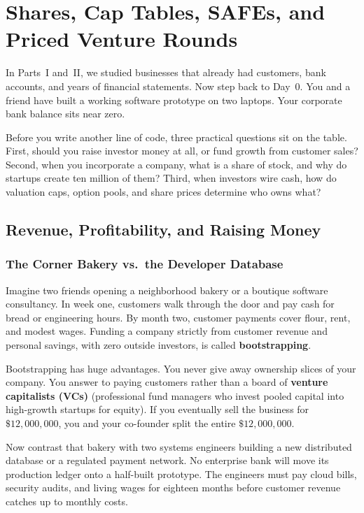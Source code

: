 \chapter{Shares, Cap Tables, SAFEs, and Priced Venture Rounds}
\label{ch:cap-tables-safes}
\chapterline

In Parts~I and~II, we studied businesses that already had customers, bank accounts, and years of financial statements. Now step back to Day~0. You and a friend have built a working software prototype on two laptops. Your corporate bank balance sits near zero.

Before you write another line of code, three practical questions sit on the table. First, should you raise investor money at all, or fund growth from customer sales? Second, when you incorporate a company, what is a share of stock, and why do startups create ten million of them? Third, when investors wire cash, how do valuation caps, option pools, and share prices determine who owns what?



\section{Revenue, Profitability, and Raising Money}
\label{sec:startup-financial-trajectory}

\subsection{The Corner Bakery vs.\ the Developer Database}

Imagine two friends opening a neighborhood bakery or a boutique software consultancy. In week one, customers walk through the door and pay cash for bread or engineering hours. By month two, customer payments cover flour, rent, and modest wages. Funding a company strictly from customer revenue and personal savings, with zero outside investors, is called \textbf{bootstrapping}.

Bootstrapping has huge advantages. You never give away ownership slices of your company. You answer to paying customers rather than a board of \textbf{venture capitalists (VCs)} (professional fund managers who invest pooled capital into high-growth startups for equity). If you eventually sell the business for $\$12{,}000{,}000$, you and your co-founder split the entire $\$12{,}000{,}000$.

Now contrast that bakery with two systems engineers building a new distributed database or a regulated payment network. No enterprise bank will move its production ledger onto a half-built prototype. The engineers must pay cloud bills, security audits, and living wages for eighteen months before customer revenue catches up to monthly costs.

